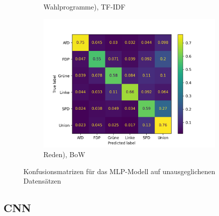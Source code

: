 \begin{figure}[H]
\begin{subfigure}{0.49\textwidth}
    \caption{Wahlprogramme), \ac{TF-IDF}}
    \label{sfig:confusionMatrixMlpManifestUnbalanced}
\end{subfigure}
\hfill
\begin{subfigure}{0.49\textwidth}
    \includegraphics[width=\textwidth]{data/images/modeling/mlp/none/speeches_confusion_matrix.png}
    \caption{Reden), \ac{BoW}}
    \label{sfig:confusionMatrixMlpSpeechesUnbalanced}
\end{subfigure}
\caption{Konfusionsmatrizen für das \acs{MLP}-Modell auf unausgeglichenen Datensätzen} \label{fig:confusionMatrixMlpUnbalanced}
\end{figure}

\subsection*{CNN}


